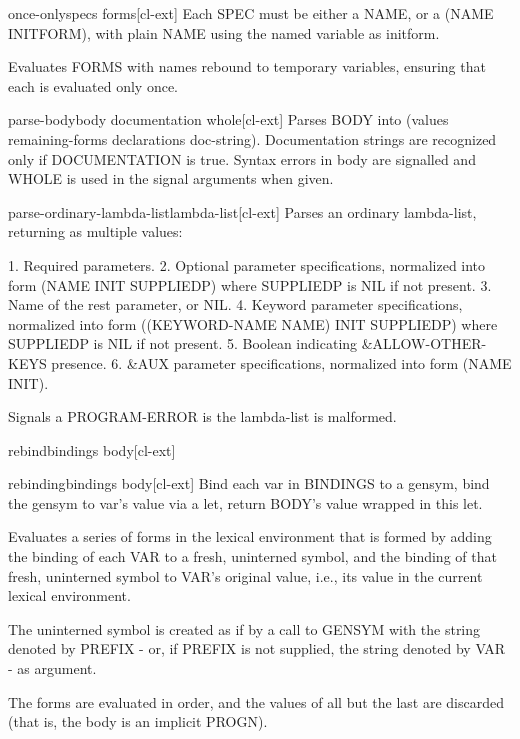 \documentclass[10pt,english]{book}
\begin{document}
\begin{macro}{once-only}{specs \body forms}[cl-ext]
  Each SPEC must be either a NAME, or a (NAME INITFORM), with plain
NAME using the named variable as initform.

Evaluates FORMS with names rebound to temporary variables, ensuring
that each is evaluated only once.
\end{macro}

\begin{function}{parse-body}{body \key documentation whole}[cl-ext]
  Parses BODY into (values remaining-forms declarations doc-string).
Documentation strings are recognized only if DOCUMENTATION is true.
Syntax errors in body are signalled and WHOLE is used in the signal
arguments when given.
\end{function}

\begin{function}{parse-ordinary-lambda-list}{lambda-list}[cl-ext]
  Parses an ordinary lambda-list, returning as multiple values:

 1. Required parameters.
 2. Optional parameter specifications, normalized into form (NAME INIT SUPPLIEDP)
    where SUPPLIEDP is NIL if not present.
 3. Name of the rest parameter, or NIL.
 4. Keyword parameter specifications, normalized into form ((KEYWORD-NAME NAME) INIT SUPPLIEDP)
    where SUPPLIEDP is NIL if not present.
 5. Boolean indicating \&ALLOW-OTHER-KEYS presence.
 6. \&AUX parameter specifications, normalized into form (NAME INIT).

Signals a PROGRAM-ERROR is the lambda-list is malformed.
\end{function}

\begin{macro}{rebind}{bindings \body body}[cl-ext]
  
\end{macro}

\begin{macro}{rebinding}{bindings \body body}[cl-ext]
  Bind each var in BINDINGS to a gensym, bind the gensym to
var's value via a let, return BODY's value wrapped in this let.

Evaluates a series of forms in the lexical environment that is
formed by adding the binding of each VAR to a fresh, uninterned
symbol, and the binding of that fresh, uninterned symbol to VAR's
original value, i.e., its value in the current lexical
environment.

The uninterned symbol is created as if by a call to GENSYM with the
string denoted by PREFIX - or, if PREFIX is not supplied, the string
denoted by VAR - as argument.

The forms are evaluated in order, and the values of all but the last
are discarded (that is, the body is an implicit PROGN).
\end{macro}
\end{document}
